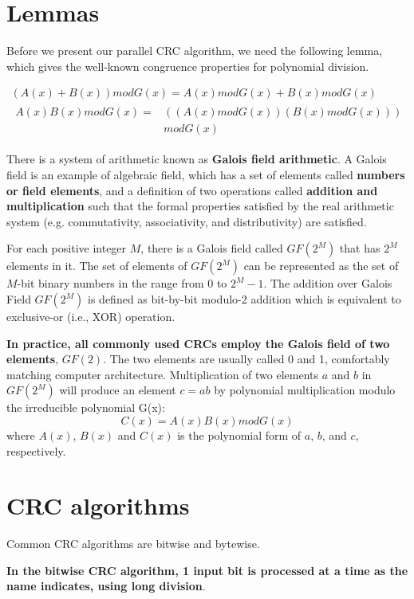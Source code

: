 \documentclass[fleqn]{IEEEtran}
\begin{document}
\section{Lemmas}
Before we present our parallel CRC algorithm, we need the following lemma, 
which gives the well-known congruence properties for polynomial division.

\begin{small}
\begin{gather}
   (A(x)+B(x))modG(x)=A(x)modG(x)+B(x)modG(x) \\
   \begin{split}
   A(x)B(x)modG(x)= & ((A(x)modG(x))(B(x)modG(x))) \\ & modG(x)
   \end{split}
\end{gather}
\end{small}

There is a system of arithmetic known as \textbf{Galois field arithmetic}. 
A Galois field is an example of algebraic field, which has a set of elements 
called \textbf{numbers or field elements}, and a definition of two operations 
called \textbf{addition and multiplication }such that the formal properties 
satisfied by the real arithmetic system (e.g. commutativity, associativity, and
distributivity) are satisfied. 

For each positive integer $M$, there is a Galois field called $GF(2^{M})$ that 
has $2^{M}$ elements in it. The set of elements of $GF(2^{M})$ can be
represented as the set of $M$-bit binary numbers in the range from $0$ to 
$2^{M}-1$. The addition over Galois Field $GF(2^{M})$ is defined as bit-by-bit 
modulo-2 addition which is equivalent to exclusive-or (i.e., XOR) operation.

\textbf{In practice, all commonly used CRCs employ the Galois field of two 
elements}, $GF(2)$. The two elements are usually called 0 and 1, 
comfortably matching computer architecture. Multiplication of two elements $a$ 
and $b$ in $GF(2^{M})$ will produce an element $c=ab$ by polynomial 
multiplication modulo the irreducible polynomial G(x):
\[
   C(x)=A(x)B(x)modG(x)
\]
where $A(x)$, $B(x)$ and $C(x)$ is the polynomial form of $a$, $b$, and $c$, 
respectively.


\section{CRC algorithms}
Common CRC algorithms are bitwise and bytewise. 

\textbf{In the bitwise CRC algorithm, 1 input bit is processed at a time as 
the name indicates, using long division}. 
\end{document}
